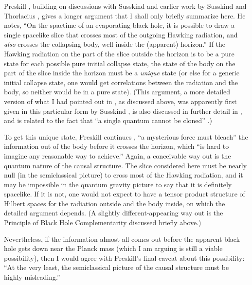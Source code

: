 \documentclass[12pt]{article}
\begin{document}
     Preskill \cite{Pre92}, building on discussions with Susskind and
earlier
work by Susskind and Thorlacius \cite{SusTho}, gives a longer
argument that I
shall only briefly summarize here.  He notes, ``On the spactime of an
evaporating black hole, it is possible to draw a single spacelike
slice that
crosses most of the outgoing Hawking radiation, and {\it also}
crosses the
collapsing body, well inside the (apparent) horizon.''  If the
Hawking
radiation
on the part of the slice outside the horizon is to be a pure state
for each
possible pure initial collapse state, the state of the body on the
part of the
slice inside the horizon must be a {\it unique} state (or else for a
generic
initial collapse state, one would get correlations between the
radiation and
the body, so neither would be in a pure state).  (This argument,
a more detailed version of what I had pointed out in \cite{Pag80b},
as discussed above, was apparently first given in this particular
form by
Susskind \cite{SusAsp}, is also discussed in further detail in
\cite{DanSch,STU}, and is related to the fact that ``a single
quantum cannot be cloned'' \cite{WooZur}.)

    To get this unique state, Preskill continues \cite{Pre92}, ``a
mysterious
force must bleach'' the information out of the body before it crosses
the
horizon, which ``is hard to imagine any reasonable way to achieve.''
Again, a
conceivable way out is the quantum nature of the causal structure.
The slice
considered here must be nearly null (in the semiclassical picture) to
cross
most of the Hawking radiation, and it may be impossible in the
quantum gravity
picture to say that it is definitely spacelike.  If it is not, one
would not
expect to have a tensor product structure of Hilbert spaces for the
radiation
outside and the body inside, on which the detailed argument depends.
(A
slightly different-appearing  way out is the Principle of Black Hole
Complementarity \cite{STU,Sus,SusT} discussed briefly above.)

     Nevertheless, if the information almost all comes out
before the apparent black hole gets down near the Planck mass (which
I
am arguing is still a viable possibility), then I would
agree with Preskill's final caveat about this possibility:  ``At the
very
least, the semiclassical picture of the causal structure must be
highly
misleading.''
\end{document}
